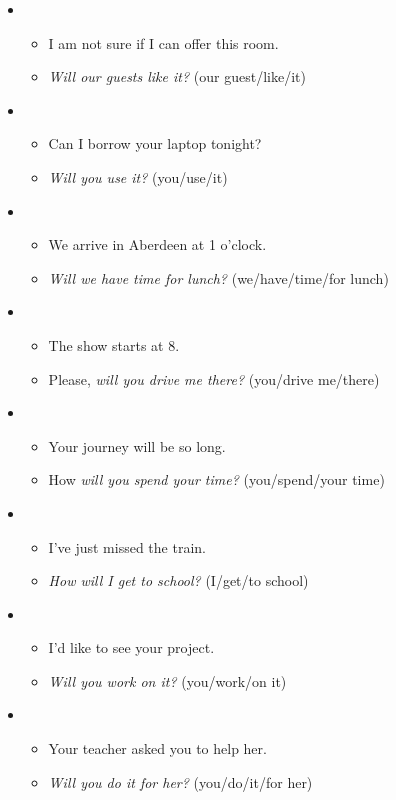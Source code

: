 \begin{itemize}

\item
\begin{itemize}
\item I am not sure if I can offer this room.
\item \textit{Will our guests like it?} (our guest/like/it)
\end{itemize}

\item
\begin{itemize}
\item Can I borrow your laptop tonight? 
\item \textit{Will you use it?} (you/use/it)
\end{itemize}

\item
\begin{itemize}
\item We arrive in Aberdeen at 1 o'clock.
\item \textit{Will we have time for lunch?} (we/have/time/for lunch)
\end{itemize}

\item
\begin{itemize}
\item The show starts at 8.
\item Please, \textit{will you drive me there?} (you/drive me/there)
\end{itemize}

\item
\begin{itemize}
\item Your journey will be so long.
\item How \textit{will you spend your time?} (you/spend/your time)
\end{itemize}

\item
\begin{itemize}
\item I've just missed the train. 
\item \textit{How will I get to school?} (I/get/to school)
\end{itemize}

\item
\begin{itemize}
\item I'd like to see your project. 
\item \textit{Will you work on it?} (you/work/on it) 
\end{itemize}

\item
\begin{itemize}
\item Your teacher asked you to help her. 
\item \textit{Will you do it for her?} (you/do/it/for her)
\end{itemize}

\end{itemize}

